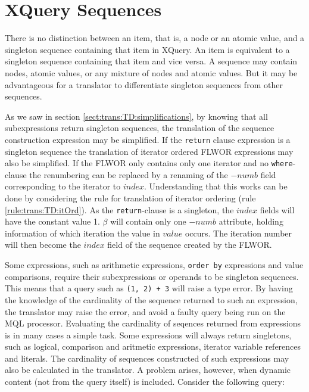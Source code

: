 \section{XQuery Sequences}
\label{sect:disc:singelton}

There is no distinction between an item, that is, a node or an atomic value, and a singleton sequence containing
that item in XQuery. An item is equivalent to a singleton sequence containing that item and vice versa. A sequence
may contain nodes, atomic values, or any mixture of nodes and atomic values. But it may be advantageous for a
translator to differentiate singleton sequences from other sequences. 

As we saw in section \ref{sect:trans:TD:simplifications}, by knowing that all subexpressions return singleton
sequences, the translation of the sequence construction expression may be simplified. If the \texttt{return}
clause expression is a singleton sequence the translation of iterator ordered FLWOR expressions may also be
simplified. If the FLWOR only contains only one iterator and no \texttt{where}-clause the renumbering can be
replaced by a renaming of the $-numb$ field corresponding to the iterator to $index$. Understanding that this
works can be done by considering the rule for translation of iterator ordering (rule \ref{rule:trans:TD:itOrd}).
As the \texttt{return}-clause is a singleton, the $index$ fields will have the constant value 1. $\beta$ will
contain only one $-numb$ attribute, holding information of which iteration the value in $value$ occurs. The
iteration number will then become the $index$ field of the sequence created by the FLWOR.

Some expressions, such as arithmetic expressions, \texttt{order by} expressions and value comparisons, require
their subexpressions or operands to be singleton sequences. This means that a query such as \texttt{(1, 2) + 3}
will raise a type error. By having the knowledge of the cardinality of the sequence returned to such an
expression, the translator may raise the error, and avoid a faulty query being run on the MQL processor.
Evaluating the cardinality of seqences returned from expressions is in many cases a simple task. Some expressions
will always return singletons, such as logical, comparison and aritmetic expressions, iterator variable references
and literals. The cardinality of sequences constructed of such expressions may also be calculated in the
translator. A problem arises, however, when dynamic content (not from the query
itself) is included. Consider the following query:


